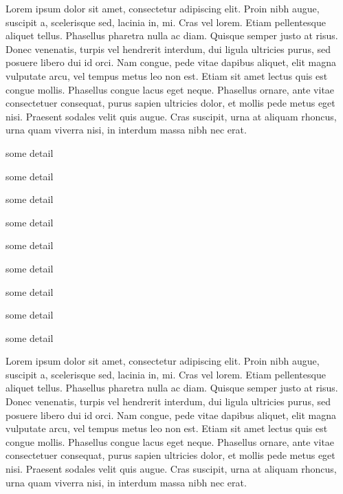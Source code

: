 \documentclass[12pt,a4paper,oneside]{book}
\begin{document}
  Lorem ipsum dolor sit amet, consectetur adipiscing elit. Proin nibh augue, suscipit a, scelerisque sed, lacinia in, mi. Cras vel lorem. Etiam pellentesque aliquet tellus. Phasellus pharetra nulla ac diam. Quisque semper justo at risus. Donec venenatis, turpis vel hendrerit interdum, dui ligula ultricies purus, sed posuere libero dui id orci. Nam congue, pede vitae dapibus aliquet, elit magna vulputate arcu, vel tempus metus leo non est. Etiam sit amet lectus quis est congue mollis. Phasellus congue lacus eget neque. Phasellus ornare, ante vitae consectetuer consequat, purus sapien ultricies dolor, et mollis pede metus eget nisi. Praesent sodales velit quis augue. Cras suscipit, urna at aliquam rhoncus, urna quam viverra nisi, in interdum massa nibh nec erat.
  
\begin{description}[align=left]
\item [Kate] some detail
\item [Christina]some detail
\item [Laura]some detail
\end{description}
\begin{description}[align=right]
\item [Kate] some detail
\item [Christina]some detail
\item [Laura]some detail
\end{description}
\begin{description}[align=right,labelwidth=3cm]
\item [Kate] some detail
\item [Christina]some detail
\item [Laura]some detail
\end{description}

  Lorem ipsum dolor sit amet, consectetur adipiscing elit. Proin nibh augue, suscipit a, scelerisque sed, lacinia in, mi. Cras vel lorem. Etiam pellentesque aliquet tellus. Phasellus pharetra nulla ac diam. Quisque semper justo at risus. Donec venenatis, turpis vel hendrerit interdum, dui ligula ultricies purus, sed posuere libero dui id orci. Nam congue, pede vitae dapibus aliquet, elit magna vulputate arcu, vel tempus metus leo non est. Etiam sit amet lectus quis est congue mollis. Phasellus congue lacus eget neque. Phasellus ornare, ante vitae consectetuer consequat, purus sapien ultricies dolor, et mollis pede metus eget nisi. Praesent sodales velit quis augue. Cras suscipit, urna at aliquam rhoncus, urna quam viverra nisi, in interdum massa nibh nec erat.
  
\end{document}

